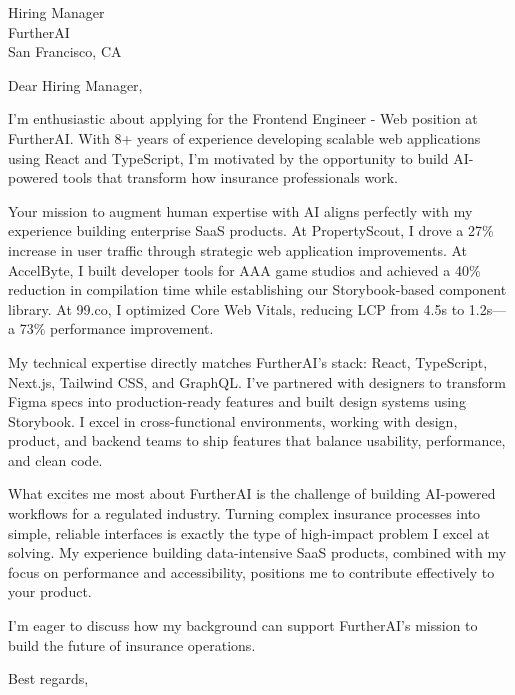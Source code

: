 \documentclass[11pt]{letter}
\begin{document}
\begin{letter}{%
Hiring Manager \\
FurtherAI \\
San Francisco, CA
}

\opening{Dear Hiring Manager,}

I'm enthusiastic about applying for the Frontend Engineer - Web position at FurtherAI. With 8+ years of experience developing scalable web applications using React and TypeScript, I'm motivated by the opportunity to build AI-powered tools that transform how insurance professionals work.

Your mission to augment human expertise with AI aligns perfectly with my experience building enterprise SaaS products. At PropertyScout, I drove a 27\% increase in user traffic through strategic web application improvements. At AccelByte, I built developer tools for AAA game studios and achieved a 40\% reduction in compilation time while establishing our Storybook-based component library. At 99.co, I optimized Core Web Vitals, reducing LCP from 4.5s to 1.2s---a 73\% performance improvement.

My technical expertise directly matches FurtherAI's stack: React, TypeScript, Next.js, Tailwind CSS, and GraphQL. I've partnered with designers to transform Figma specs into production-ready features and built design systems using Storybook. I excel in cross-functional environments, working with design, product, and backend teams to ship features that balance usability, performance, and clean code.

What excites me most about FurtherAI is the challenge of building AI-powered workflows for a regulated industry. Turning complex insurance processes into simple, reliable interfaces is exactly the type of high-impact problem I excel at solving. My experience building data-intensive SaaS products, combined with my focus on performance and accessibility, positions me to contribute effectively to your product.

I'm eager to discuss how my background can support FurtherAI's mission to build the future of insurance operations.

\closing{Best regards,}

\end{letter}
\end{document}

